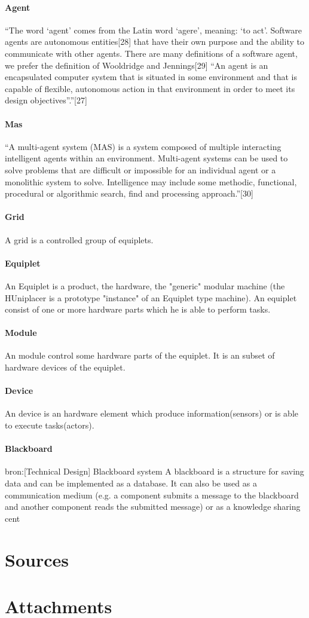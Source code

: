 \documentclass[12pt,a4paper]{report}
\begin{document}
\subsubsection{Agent}
“The word ‘agent’ comes from the Latin word ‘agere’, meaning: ‘to act’. Software agents are autonomous entities[28] that have their own purpose and the ability to communicate with other agents. There are many definitions of a software agent, we prefer the definition of Wooldridge and Jennings[29] “An agent is an encapsulated computer system that is situated in some environment and that is capable of flexible, autonomous action in that environment in
order to meet its design objectives”.”[27]
\subsubsection{Mas}
“A multi-agent system (MAS) is a system composed of multiple interacting intelligent agents within an environment. Multi-agent systems can be used to solve problems that are difficult or impossible for an individual agent or a monolithic system to solve. Intelligence may include some methodic, functional, procedural or algorithmic search, find and processing approach.”[30]
\subsubsection{Grid}
A grid is a controlled group of equiplets.
\subsubsection{Equiplet}
An Equiplet is a product, the hardware, the "generic" modular machine (the HUniplacer is a prototype "instance" of an Equiplet type machine). An equiplet consist of one or more hardware parts which he is able to perform tasks.
\subsubsection{Module}
An module control some hardware parts of the equiplet. It is an subset of hardware devices of the equiplet.
\subsubsection{Device}
An device is an hardware element which produce information(sensors) or is able to execute tasks(actors).
\subsubsection{Blackboard}
bron:[Technical Design] Blackboard system
A blackboard is a structure for saving data and can be implemented as a database. It can also be used as a communication medium (e.g. a component submits a message to the blackboard and another component reads the submitted message) or as a knowledge sharing cent

\chapter{Sources}

\chapter{Attachments}



\end{document}
